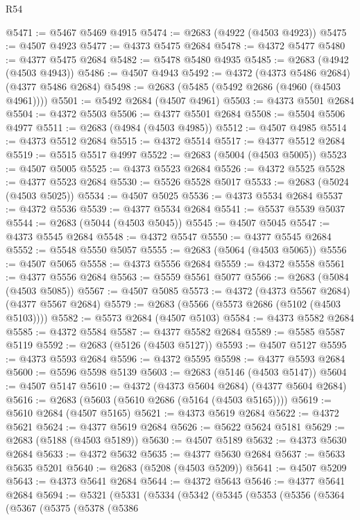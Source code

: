 \begin{lexlean}{R54}
\begin{coremodule}
@5471 := @5467 @5469 @4915
@5474 := @2683 (@4922 (@4503 @4923))
@5475 := @4507 @4923
@5477 := @4373 @5475 @2684
@5478 := @4372 @5477
@5480 := @4377 @5475 @2684
@5482 := @5478 @5480 @4935
@5485 := @2683 (@4942 (@4503 @4943))
@5486 := @4507 @4943
@5492 := @4372 (@4373 @5486 @2684) (@4377 @5486 @2684)
@5498 := @2683 (@5485 (@5492 @2686 (@4960 (@4503 @4961))))
@5501 := @5492 @2684 (@4507 @4961)
@5503 := @4373 @5501 @2684
@5504 := @4372 @5503
@5506 := @4377 @5501 @2684
@5508 := @5504 @5506 @4977
@5511 := @2683 (@4984 (@4503 @4985))
@5512 := @4507 @4985
@5514 := @4373 @5512 @2684
@5515 := @4372 @5514
@5517 := @4377 @5512 @2684
@5519 := @5515 @5517 @4997
@5522 := @2683 (@5004 (@4503 @5005))
@5523 := @4507 @5005
@5525 := @4373 @5523 @2684
@5526 := @4372 @5525
@5528 := @4377 @5523 @2684
@5530 := @5526 @5528 @5017
@5533 := @2683 (@5024 (@4503 @5025))
@5534 := @4507 @5025
@5536 := @4373 @5534 @2684
@5537 := @4372 @5536
@5539 := @4377 @5534 @2684
@5541 := @5537 @5539 @5037
@5544 := @2683 (@5044 (@4503 @5045))
@5545 := @4507 @5045
@5547 := @4373 @5545 @2684
@5548 := @4372 @5547
@5550 := @4377 @5545 @2684
@5552 := @5548 @5550 @5057
@5555 := @2683 (@5064 (@4503 @5065))
@5556 := @4507 @5065
@5558 := @4373 @5556 @2684
@5559 := @4372 @5558
@5561 := @4377 @5556 @2684
@5563 := @5559 @5561 @5077
@5566 := @2683 (@5084 (@4503 @5085))
@5567 := @4507 @5085
@5573 := @4372 (@4373 @5567 @2684) (@4377 @5567 @2684)
@5579 := @2683 (@5566 (@5573 @2686 (@5102 (@4503 @5103))))
@5582 := @5573 @2684 (@4507 @5103)
@5584 := @4373 @5582 @2684
@5585 := @4372 @5584
@5587 := @4377 @5582 @2684
@5589 := @5585 @5587 @5119
@5592 := @2683 (@5126 (@4503 @5127))
@5593 := @4507 @5127
@5595 := @4373 @5593 @2684
@5596 := @4372 @5595
@5598 := @4377 @5593 @2684
@5600 := @5596 @5598 @5139
@5603 := @2683 (@5146 (@4503 @5147))
@5604 := @4507 @5147
@5610 := @4372 (@4373 @5604 @2684) (@4377 @5604 @2684)
@5616 := @2683 (@5603 (@5610 @2686 (@5164 (@4503 @5165))))
@5619 := @5610 @2684 (@4507 @5165)
@5621 := @4373 @5619 @2684
@5622 := @4372 @5621
@5624 := @4377 @5619 @2684
@5626 := @5622 @5624 @5181
@5629 := @2683 (@5188 (@4503 @5189))
@5630 := @4507 @5189
@5632 := @4373 @5630 @2684
@5633 := @4372 @5632
@5635 := @4377 @5630 @2684
@5637 := @5633 @5635 @5201
@5640 := @2683 (@5208 (@4503 @5209))
@5641 := @4507 @5209
@5643 := @4373 @5641 @2684
@5644 := @4372 @5643
@5646 := @4377 @5641 @2684
@5694 := @5321
    (@5331
      (@5334
        (@5342
          (@5345
            (@5353
              (@5356
                (@5364
                  (@5367
                    (@5375
                      (@5378
                        (@5386

\end{coremodule}
\end{lexlean}
